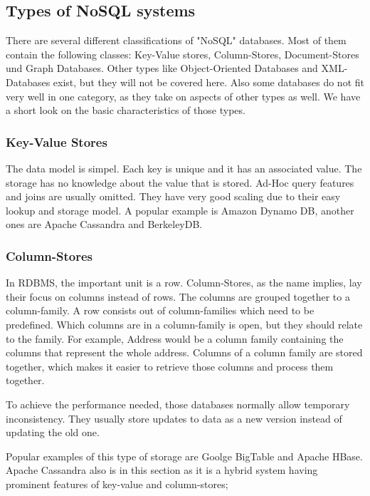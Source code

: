 \documentclass{acm_proc_article-sp}
\begin{document}
\subsection{Types of NoSQL systems}

There are several different classifications of "NoSQL" databases. Most of them contain the following classes: Key-Value stores, Column-Stores, Document-Stores und Graph Databases. Other types like Object-Oriented Databases and XML-Databases exist, but they will not be covered here. Also some databases do not fit very well in one category, as they take on aspects of other types as well. We have a short look on the basic characteristics of those types.

\subsubsection{Key-Value Stores}

The data model is simpel. Each key is unique and it has an associated value. The storage has no knowledge about the value that is stored. Ad-Hoc query features and joins are usually omitted. They have very good scaling due to their easy lookup and storage model. A popular example is Amazon Dynamo DB, another ones are Apache Cassandra and BerkeleyDB\cite{Nayak_typeof}.
	
\subsubsection{Column-Stores}

In RDBMS, the important unit is a row. Column-Stores, as the name implies, lay their focus on columns instead of rows. The columns are grouped together to a column-family. A row consists out of column-families which need to be predefined. Which columns are in a column-family is open, but they should relate to the family. For example, Address would be a column family containing the columns that represent the whole address. Columns of a column family are stored together, which makes it easier to retrieve those columns and process them together.

To achieve the performance needed, those databases normally allow temporary inconsistency. They usually store updates to data as a new version instead of updating the old one.

Popular examples of this type of storage are Goolge BigTable and Apache HBase. Apache Cassandra also is in this section as it is a hybrid system having prominent features of key-value and column-stores\cite{Nayak_typeof}\cite{DBLP:conf/services/GudivadaRR14};
\end{document}
